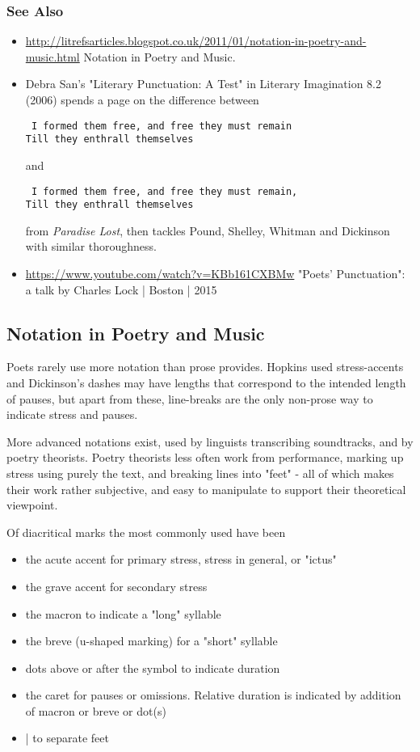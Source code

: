 \documentclass[11pt]{article}
\begin{document}
\subsubsection*{See Also}
\begin{itemize}\item \url{http://litrefsarticles.blogspot.co.uk/2011/01/notation-in-poetry-and-music.html} Notation in Poetry and Music.
\item Debra San's "Literary Punctuation: A Test" in Literary Imagination 8.2 (2006) spends a page on the difference between
\begin{verbatim}
 I formed them free, and free they must remain
Till they enthrall themselves
\end{verbatim}

and
\begin{verbatim}
 I formed them free, and free they must remain,
Till they enthrall themselves
\end{verbatim}

from \textit{Paradise Lost}, then tackles Pound, Shelley, Whitman and Dickinson with similar thoroughness.
\item \url{https://www.youtube.com/watch?v=KBb161CXBMw} "Poets' Punctuation": a talk by Charles Lock | Boston | 2015


\end{itemize}


\newpage\subsection{Notation in Poetry and Music}

Poets rarely use more notation than prose provides. Hopkins used stress-accents and Dickinson's dashes may have lengths that correspond to the intended length of pauses, but apart from these, line-breaks are the only non-prose way to indicate stress and pauses.


More advanced notations exist, used by linguists  transcribing soundtracks, and by poetry theorists. Poetry theorists less often work from performance, marking up stress using purely the text, and breaking lines into "feet" - all of which makes
their work rather subjective, and easy to manipulate to support their theoretical viewpoint.



Of diacritical marks the most commonly used have been 
\begin{itemize}
\item the acute accent  for primary stress, stress in general, or "ictus"
\item the grave accent for secondary stress
\item the macron  to indicate a "long" syllable 
\item the breve (u-shaped marking) for a "short" syllable
\item dots above or after the symbol to indicate duration
\item the caret for pauses or omissions. Relative duration is indicated by addition of macron or breve or dot(s)
\item  | to separate feet 
\end{itemize}
\end{document}

